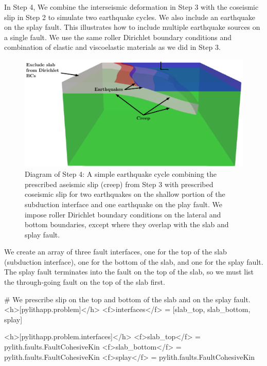 In Step 4, We combine the interseismic deformation in Step 3 with the
coseismic slip in Step 2 to simulate two earthquake cycles. We also
include an earthquake on the splay fault. This illustrates how to
include multiple earthquake sources on a single fault. We use the same
roller Dirichlet boundary conditions and combination of elastic and
viscoelastic materials as we did in Step 3.

\begin{figure}[htbp]
  \includegraphics[scale=0.75]{examples/figs/subduction3d_step04_diagram}
  \caption{Diagram of Step 4: A simple earthquake cycle combining the
    prescribed aseismic slip (creep) from Step 3 with prescribed
    coseismic slip for two earthquakes on the shallow portion of the
    subduction interface and one earthquake on the play fault. We
    impose roller Dirichlet boundary conditions on the lateral and
    bottom boundaries, except where they overlap with the slab and
    splay fault.}
  \label{fig:example:subduction:3d:step04:diagram}
\end{figure}

We create an array of three fault interfaces, one for the top of the
slab (subduction interface), one for the bottom of the slab, and one
for the splay fault. The splay fault terminates into the fault on the
top of the slab, so we must list the through-going fault on the top of
the slab first.
\begin{cfg}
# We prescribe slip on the top and bottom of the slab and on the splay fault.
<h>[pylithapp.problem]</h>
<f>interfaces</f> = [slab_top, slab_bottom, splay]

<h>[pylithapp.problem.interfaces]</h>
<f>slab_top</f> = pylith.faults.FaultCohesiveKin
<f>slab_bottom</f> = pylith.faults.FaultCohesiveKin
<f>splay</f> = pylith.faults.FaultCohesiveKin
\end{cfg}


